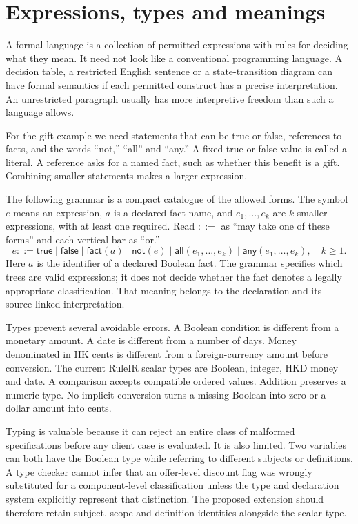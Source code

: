 \section{Expressions, types and meanings}
\label{merge:M03:04}

\label{sec:proof-language}
A formal language is a collection of permitted expressions with rules for
deciding what they mean. It need not look like a conventional programming
language. A decision table, a restricted English sentence or a state-transition
diagram can have formal semantics if each permitted construct has a precise
interpretation. An unrestricted paragraph usually has more interpretive freedom
than such a language allows.

For the gift example we need statements that can be true or false, references
to facts, and the words ``not,'' ``all'' and ``any.'' A fixed true or false value
is called a literal. A reference asks for a named fact, such as whether this
benefit is a gift. Combining smaller statements makes a larger expression.

The following grammar is a compact catalogue of the allowed forms. The symbol
$e$ means an expression, $a$ is a declared fact name, and $e_1,\ldots,e_k$
are $k$ smaller expressions, with at least one required. Read $::=$ as ``may
take one of these forms'' and each vertical bar as ``or.''
\begin{equation}
 e ::= \mathsf{true}\mid\mathsf{false}\mid\mathsf{fact}(a)
       \mid\mathsf{not}(e)\mid\mathsf{all}(e_1,\ldots,e_k)
       \mid\mathsf{any}(e_1,\ldots,e_k),\quad k\geq 1.
 \label{eq:boolean-grammar}
\end{equation}
Here $a$ is the identifier of a declared Boolean fact. The grammar specifies
which trees are valid expressions; it does not decide whether the fact denotes
a legally appropriate classification. That meaning belongs to the declaration
and its source-linked interpretation.

Types prevent several avoidable errors. A Boolean condition is different from
a monetary amount. A date is different from a number of days. Money denominated
in HK cents is different from a foreign-currency amount before conversion.
The current RuleIR scalar types are Boolean, integer, HKD money and date. A
comparison accepts compatible ordered values. Addition preserves a numeric
type. No implicit conversion turns a missing Boolean into zero or a dollar
amount into cents.


Typing is valuable because it can reject an entire class of malformed
specifications before any client case is evaluated. It is also limited. Two
variables can both have the Boolean type while referring to different subjects
or definitions. A type checker cannot infer that an offer-level discount flag
was wrongly substituted for a component-level classification unless the type
and declaration system explicitly represent that distinction. The proposed
extension should therefore retain subject, scope and definition identities
alongside the scalar type.

